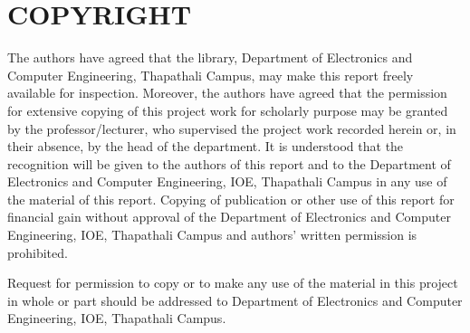 \chapter*{COPYRIGHT}

The authors have agreed that the library, Department of Electronics and Computer Engineering, Thapathali Campus, may make this report freely available for inspection. Moreover, the authors have agreed that the permission for extensive copying of this project work for scholarly purpose may be granted by the professor/lecturer, who supervised the project work recorded herein or, in their absence, by the head of the department. It is understood that the recognition will be given to the authors of this report and to the Department of Electronics and Computer Engineering, IOE, Thapathali Campus in any use of the material of this report. Copying of publication or other use of this report for financial gain without approval of the Department of Electronics and Computer Engineering, IOE, Thapathali Campus and authors' written permission is prohibited. 

Request for permission to copy or to make any use of the material in this project in whole or part should be addressed to Department of Electronics and Computer Engineering, IOE, Thapathali Campus.
